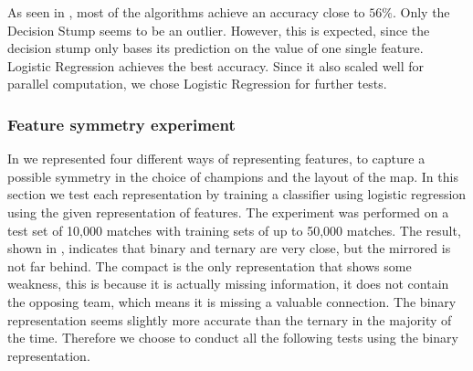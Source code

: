 As seen in , most of the algorithms achieve an accuracy close to $56 \%$. Only the Decision Stump seems to be an outlier. However, this is expected, since the decision stump only bases its prediction on the value of one single feature.
Logistic Regression achieves the best accuracy. Since it also scaled well for parallel computation, we chose Logistic Regression for further tests.

\subsubsection{Feature symmetry experiment}
In  we represented four different ways of representing features, to capture a possible symmetry in the choice of champions and the layout of the map. In this section we test each representation by training a classifier using logistic regression using the given representation of features. The experiment was performed on a test set of 10,000 matches with training sets of up to 50,000 matches. The result, shown in , indicates that binary and ternary are very close, but the mirrored is not far behind. The compact is the only representation that shows some weakness, this is because it is actually missing information, it does not contain the opposing team, which means it is missing a valuable connection. The binary representation seems slightly more accurate than the ternary in the majority of the time. Therefore we choose to conduct all the following tests using the binary representation. 

